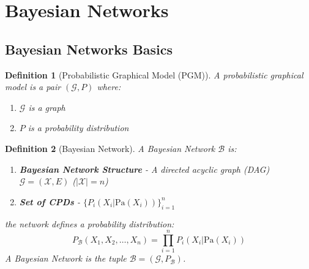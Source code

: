 \documentclass[11pt]{article}
\numberwithin{equation}{section}
\theoremstyle{boldStyle}
\theoremstyle{boldBlueStyle}
\theoremstyle{boldPurpleStyle}
\theoremstyle{boldRedStyle}
\newtheorem{definition}{Definition}[section]
\begin{document}
\newpage
\section{Bayesian Networks}

\subsection{Bayesian Networks Basics}

\begin{definition}[Probabilistic Graphical Model (PGM)]
    A probabilistic graphical model is a pair $(\mathcal{G}, P)$ where:
    \begin{enumerate}
        \item $\mathcal{G}$ is a graph
        \item $P$ is a probability distribution
    \end{enumerate}
\end{definition}

\begin{definition}[Bayesian Network]
    A Bayesian Network $\mathcal{B}$ is:
    \begin{enumerate}
        \item \textbf{Bayesian Network Structure} - A directed acyclic graph (DAG) $\mathcal{G} = (\mathcal{X}, E)$  ($|\mathcal{X}| = n$)
        \item \textbf{Set of CPDs} - $\{ P_i(X_i | \text{Pa}(X_i) ) \}_{i=1}^{n}$ 
    \end{enumerate}
    the network defines a probability distribution: 
    \begin{equation*}
        P_{\mathcal{B}}(X_1, X_2, \ldots, X_n) = \prod_{i=1}^{n} P_i(X_i | \text{Pa}(X_i))
    \end{equation*}
    A Bayesian Network is the tuple $\mathcal{B} = (\mathcal{G}, P_{\mathcal{B}})$.
\end{definition}
\end{document}
